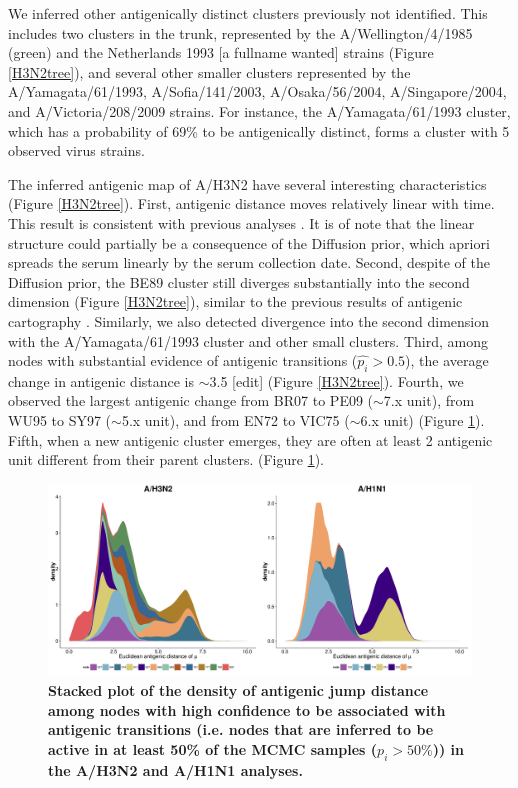 \documentclass[11pt,oneside,letterpaper]{article}
\begin{document}
We inferred other antigenically distinct clusters previously not identified. %
This includes two clusters in the trunk, represented by the A/Wellington/4/1985 (green) and the Netherlands 1993 [a fullname wanted] strains (Figure \ref{H3N2tree}), and several other smaller clusters represented by the A/Yamagata/61/1993, A/Sofia/141/2003, A/Osaka/56/2004,  A/Singapore/2004, and A/Victoria/208/2009 strains. 
For instance, the A/Yamagata/61/1993 cluster, which has a probability of 69\% to be antigenically distinct, forms a cluster with 5 observed virus strains. 


The inferred antigenic map of A/H3N2 have several interesting characteristics (Figure \ref{H3N2tree}). 
First, antigenic distance moves relatively linear with time.  
This result is consistent with previous analyses \cite{smith_mapping_2004, bedford_integrating_2014}.
It is of note that the linear structure could partially be a consequence of the Diffusion prior, which apriori spreads the serum linearly by the serum collection date. 
Second, despite of the Diffusion prior, the BE89 cluster still diverges substantially into the second dimension (Figure \ref{H3N2tree}), similar to the previous results of antigenic cartography \cite{smith_mapping_2004, bedford_integrating_2014}. 
Similarly, we also detected divergence into the second dimension with the A/Yamagata/61/1993 cluster and other small clusters. 
Third, among nodes with substantial evidence of antigenic transitions ($\hat{p_i} > 0.5$), the average change in antigenic distance is $\sim$3.5 [edit] (Figure \ref{H3N2tree}). 
Fourth, we observed the largest antigenic change from BR07 to PE09 ($\sim$7.x unit), from WU95 to SY97 ($\sim$5.x unit), and from EN72 to VIC75 ($\sim$6.x unit) (Figure \ref{stackedMuPlot}).
Fifth, when a new antigenic cluster emerges, they are often at least 2 antigenic unit different  from their parent clusters.  (Figure \ref{stackedMuPlot}). 


\begin{figure}[h]
	\centering		
	\includegraphics[width=1\textwidth]{figures/custom/stackedMuPlot}
	\caption{\textbf{Stacked plot of the density of antigenic jump distance among nodes with high confidence to be associated with antigenic transitions (i.e. nodes that are inferred to be active in at least 50\% of the MCMC samples ($p_i > 50\%$))  in the A/H3N2 and A/H1N1 analyses.}
	} 
	\label{stackedMuPlot} 
\end{figure}
\end{document}
